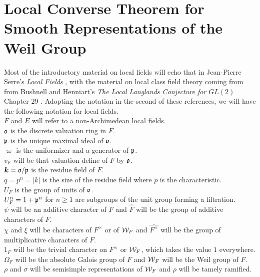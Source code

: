 \chapter{Local Converse Theorem for Smooth Representations of the Weil Group}	%

Most of the introductory material on local fields will echo that in Jean-Pierre Serre's \textit{Local Fields} \cite{Serre1979}, with the material on local class field theory coming from from Bushnell and Henniart's \textit{The Local Langlands Conjecture for $GL(2)$} Chapter 29 \cite{Bushnell2006}.
Adopting the notation in the second of these references, we will have the following notation for local fields.\\
$F$ and $E$ will refer to a non-Archimedean local fields.\\
$\mathfrak{o}$ is the discrete valuation ring in $F$.\\
$\mathfrak{p}$ is the unique maximal ideal of $\mathfrak{o}$.\\
$\varpi$ is the uniformizer and a generator of $\mathfrak{p}$.\\
$v_F$ will be that valuation define of $F$ by $\mathfrak{o}$.\\
$\bm{k} = \mathfrak{o}/\mathfrak{p}$ is the residue field of $F$.\\
$q = p^n = |k|$ is the size of the residue field where $p$ is the characteristic.\\
$U_F$ is the group of units of $\mathfrak{o}$.\\
$U_F^n = 1 + \mathfrak{p}^n$ for $n \geq 1$ are subgroups of the unit group forming a filtration.\\
$\psi$ will be an additive character of $F$ and $\widehat{F}$ will be the group of additive characters of $F$. \\
$\chi$ and $\xi$ will be characters of $F^\times$ or of $\mathcal{W}_F$ and $\widehat{F^\times}$ will be the group of multiplicative characters of $F$. \\
$1_F$ will be the trivial character on $F^\times$ or $\mathcal{W}_F$, which takes the value $1$ everywhere.
$\Omega_F$ will be the absolute Galois group of $F$ and $\mathcal{W}_F$ will be the Weil group of $F$. \\
$\rho$ and $\sigma$ will be semisimple representations of $\mathcal{W}_F$ and $\rho$ will be tamely ramified.\\


